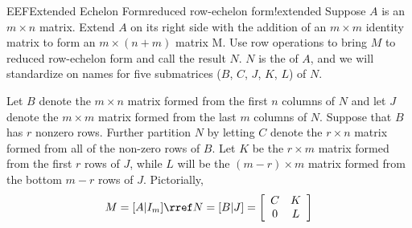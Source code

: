 \begin{definition}{EEF}{Extended Echelon Form}{reduced row-echelon form!extended}
Suppose $A$ is an $m\times n$ matrix.  Extend $A$ on its right side with the addition of an $m\times m$ identity matrix to form an $m\times (n + m)$ matrix M.  Use row operations to bring $M$ to reduced row-echelon form and call the result $N$.  $N$ is the  of $A$, and we will standardize on names for five submatrices ($B$, $C$, $J$, $K$, $L$) of $N$.\par
%
Let $B$ denote the $m\times n$ matrix formed from the first $n$ columns of $N$ and let $J$ denote the $m\times m$ matrix formed from the last $m$ columns of $N$.  Suppose that $B$ has $r$ nonzero rows.  Further partition $N$ by letting $C$ denote the $r\times n$ matrix formed from all of the non-zero rows of $B$.  Let $K$ be the $r\times m$ matrix formed from the first $r$ rows of $J$, while $L$ will be the $(m-r)\times m$ matrix formed from the bottom $m-r$ rows of $J$.  Pictorially,
%
\begin{equation*}
M=[A\vert I_m]
\rref
N=[B\vert J]
=
\left[\begin{array}{cc}C&K\\0&L\end{array}\right]
\end{equation*}
%
\end{definition}
%
%
